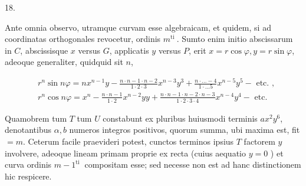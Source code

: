 \documentclass[10pt]{article}
\begin{document}
18.

Ante omnia observo, utramque curvam esse algebraicam, et quidem, si ad coordinatas orthogonales revocetur, ordinis \(m^{\text {ti }}\). Sumto enim initio abscissarum in \(C\), abscissisque \(x\) versus \(G\), applicatis \(y\) versus \(P\), erit \(x=r \cos \varphi, y=r \sin \varphi\), adeoque generaliter, quidquid sit \(n\),

\[
\begin{aligned}
& r^{n} \sin n \varphi=n x^{n-1} y-\frac{n \cdot n-1 \cdot n-2}{1 \cdot 2 \cdot 3} x^{n-3} y^{3}+\frac{n \cdot \ldots-4}{1 \cdot \ldots 5} x^{n-5} y^{5}-\text { etc. }, \\
& r^{n} \cos n \varphi=x^{n}-\frac{n \cdot n-1}{1 \cdot 2} x^{n-2} y y+\frac{n \cdot n-1 \cdot n-2 \cdot n-3}{1 \cdot 2 \cdot 3 \cdot 4} x^{n-4} y^{4}-\text { etc. }
\end{aligned}
\]

Quamobrem tum \(T\) tum \(U\) constabunt ex pluribus huiusmodi terminis \(a x^{2} y^{6}\),
denotantibus \(\alpha, b\) numeros integros positivos, quorum summa, ubi maxima est, fit \(=m\). Ceterum facile praevideri potest, cunctos terminos ipsius \(T\) factorem \(y\) involvere, adeoque lineam primam proprie ex recta (cuius aequatio \(y=0\) ) et curva ordinis \(m-1^{\text {ti }}\) compositam esse; sed necesse non est ad hanc distinctionem hic respicere.
\end{document}
